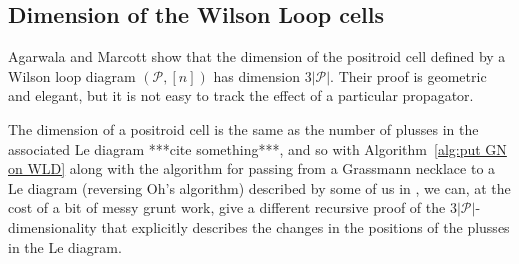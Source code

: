 \documentclass[11pt]{article}
\newcommand{\cP}{\mathcal{P}}
\theoremstyle{remark}
\theoremstyle{definition}
\begin{document}
\subsection{Dimension of the Wilson Loop cells}

Agarwala and Marcott show that the dimension of the positroid cell defined by a Wilson loop diagram $(\cP, [n])$ has dimension $3|\cP|$. Their proof is geometric and elegant, but it is not easy to track the effect of a particular propagator.

The dimension of a positroid cell is the same as the number of plusses in the associated Le diagram ***cite something***, and so with Algorithm~\ref{alg:put GN on WLD} along with the algorithm for passing from a Grassmann necklace to a Le diagram (reversing Oh's algorithm) described by some of us in \cite{reversingOh}, we can, at the cost of a bit of messy grunt work, give a different recursive proof of the $3|\cP|$-dimensionality that explicitly describes the changes in the positions of the plusses in the Le diagram.

%
%
%
%
%
\end{document}
